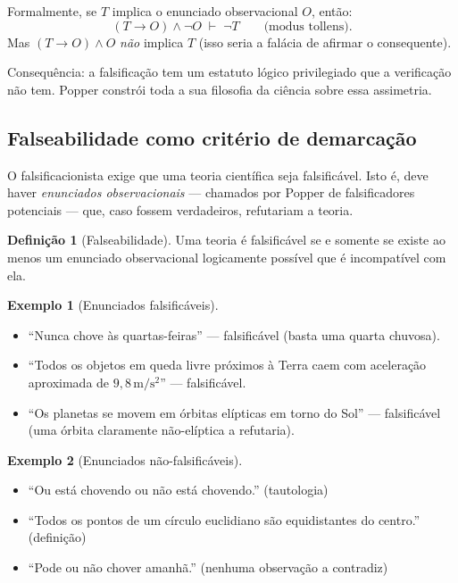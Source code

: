 \documentclass[9pt,a4paper]{extarticle}
\newcommand{\impt}[1]{\textcolor{important}{#1}}
\newcommand{\ntc}[1]{\textcolor{notice}{#1}}
\theoremstyle{definition}
\newtheorem{definition}{Definição}[section]
\newtheorem{example}{Exemplo}[section]
\begin{document}
Formalmente, se $T$ implica o enunciado observacional $O$, então:
\[
(T \rightarrow O) \wedge \neg O \;\vdash\; \neg T \qquad \text{(modus tollens)}.
\]
Mas $(T \rightarrow O) \wedge O$ \emph{não} implica $T$ (isso seria a falácia de afirmar o consequente).

\ntc{Consequência:} a falsificação tem um estatuto lógico privilegiado que a verificação não tem. Popper constrói toda a sua filosofia da ciência sobre essa assimetria.

\subsection{Falseabilidade como critério de demarcação}

O falsificacionista exige que uma teoria científica seja \impt{falsificável}. Isto é, deve haver \emph{enunciados observacionais} --- chamados por Popper de \ntc{falsificadores potenciais} --- que, caso fossem verdadeiros, refutariam a teoria.

\begin{definition}[Falseabilidade]
Uma teoria é \impt{falsificável} se e somente se existe ao menos um enunciado observacional logicamente possível que é incompatível com ela.
\end{definition}

\begin{example}[Enunciados falsificáveis]
\begin{itemize}
  \item ``Nunca chove às quartas-feiras'' --- falsificável (basta uma quarta chuvosa).
  \item ``Todos os objetos em queda livre próximos à Terra caem com aceleração aproximada de $9{,}8\,\mathrm{m/s^2}$'' --- falsificável.
  \item ``Os planetas se movem em órbitas elípticas em torno do Sol'' --- falsificável (uma órbita claramente não-elíptica a refutaria).
\end{itemize}
\end{example}

\begin{example}[Enunciados não-falsificáveis]
\begin{itemize}
  \item ``Ou está chovendo ou não está chovendo.'' (tautologia)
  \item ``Todos os pontos de um círculo euclidiano são equidistantes do centro.'' (definição)
  \item ``Pode ou não chover amanhã.'' (nenhuma observação a contradiz)
\end{itemize}
\end{example}
\end{document}
